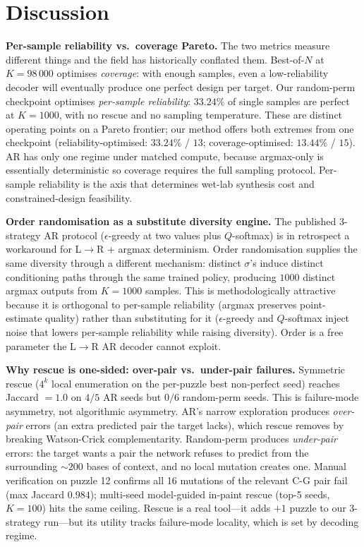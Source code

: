 \documentclass{article}
\begin{document}
\section{Discussion}
\label{sec:disc}

\noindent\textbf{Per-sample reliability vs.\ coverage Pareto.}
The two metrics measure different things and the field has
historically conflated them. Best-of-$N$ at $K{=}98\,000$ optimises
\emph{coverage}: with enough samples, even a low-reliability decoder
will eventually produce one perfect design per target. Our random-perm
checkpoint optimises \emph{per-sample reliability}: $33.24\%$ of
single samples are perfect at $K{=}1000$, with no rescue and no
sampling temperature. These are distinct operating points on a Pareto
frontier; our method offers both extremes from one checkpoint
(reliability-optimised: $33.24\%$ / $13$; coverage-optimised:
$13.44\%$ / $15$). AR has only one regime under matched compute,
because argmax-only is essentially deterministic so coverage requires
the full sampling protocol. Per-sample reliability is the axis that
determines wet-lab synthesis cost and constrained-design feasibility.

\noindent\textbf{Order randomisation as a substitute diversity engine.}
The published 3-strategy AR protocol ($\epsilon$-greedy at two values
plus $Q$-softmax) is in retrospect a workaround for L$\to$R + argmax
determinism. Order randomisation supplies the same diversity through
a different mechanism: distinct $\sigma$'s induce distinct
conditioning paths through the same trained policy, producing $1000$
distinct argmax outputs from $K{=}1000$ samples. This is methodologically
attractive because it is orthogonal to per-sample reliability (argmax
preserves point-estimate quality) rather than substituting for it
($\epsilon$-greedy and $Q$-softmax inject noise that lowers
per-sample reliability while raising diversity). Order is a free
parameter the L$\to$R AR decoder cannot exploit.

\noindent\textbf{Why rescue is one-sided: over-pair vs.\ under-pair
failures.} Symmetric rescue ($4^k$ local enumeration on the per-puzzle
best non-perfect seed) reaches Jaccard $= 1.0$ on $4/5$ AR seeds but
$0/6$ random-perm seeds. This is failure-mode asymmetry, not
algorithmic asymmetry. AR's narrow exploration produces
\emph{over-pair} errors (an extra predicted pair the target lacks),
which rescue removes by breaking Watson-Crick complementarity.
Random-perm produces \emph{under-pair} errors: the target wants a
pair the network refuses to predict from the surrounding ${\sim}200$
bases of context, and no local mutation creates one. Manual
verification on puzzle 12 confirms all 16 mutations of the relevant
C-G pair fail (max Jaccard $0.984$); multi-seed model-guided in-paint
rescue (top-5 seeds, $K{=}100$) hits the same ceiling. Rescue is a
real tool---it adds $+1$ puzzle to our 3-strategy run---but its
utility tracks failure-mode locality, which is set by decoding regime.
\end{document}
